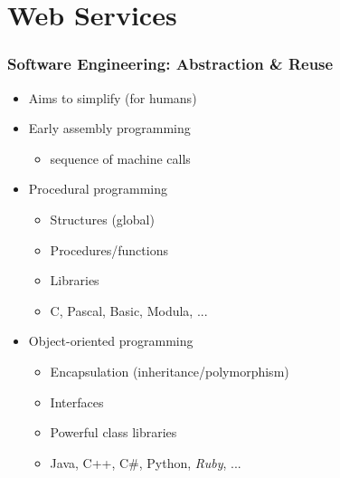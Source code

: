 \documentclass{beamer}
\begin{document}
\section{Web Services} 
\begin{frame}\frametitle{Software Engineering: Abstraction \& Reuse} 
  \begin{itemize}

    \item Aims to simplify (for humans)  \pause

    \item Early assembly programming
    \begin{itemize}
      \item sequence of machine calls
    \end{itemize}
    \pause
    \item Procedural programming
    \begin{itemize}
      \item Structures (global)
      \item Procedures/functions
      \item Libraries
      \item C, Pascal, Basic, Modula, ...
    \end{itemize}
    \pause
    \item Object-oriented programming
    \begin{itemize}
      \item Encapsulation (inheritance/polymorphism)
      \item Interfaces
      \item Powerful class libraries
      \item Java, C++, C\#, Python, \textit{Ruby}, ...
    \end{itemize}
    
  \end{itemize}
\end{frame}
\end{document}
